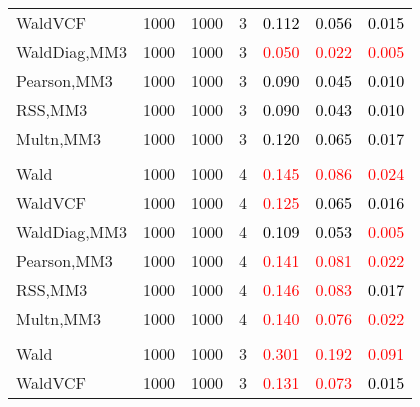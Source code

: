 \documentclass[
]{article}
\begin{document}
\begin{table}[H]
{\begin{tabular}[t]{lrrrrrr}
\hspace{1em}WaldVCF & 1000 & 1000 & 3 & \textcolor{black}{0.112} & \textcolor{black}{0.056} & \textcolor{black}{0.015}\\
\hspace{1em}WaldDiag,MM3 & 1000 & 1000 & 3 & \textcolor{red}{0.050} & \textcolor{red}{0.022} & \textcolor{red}{0.005}\\
\hspace{1em}Pearson,MM3 & 1000 & 1000 & 3 & \textcolor{black}{0.090} & \textcolor{black}{0.045} & \textcolor{black}{0.010}\\
\hspace{1em}RSS,MM3 & 1000 & 1000 & 3 & \textcolor{black}{0.090} & \textcolor{black}{0.043} & \textcolor{black}{0.010}\\
\hspace{1em}Multn,MM3 & 1000 & 1000 & 3 & \textcolor{black}{0.120} & \textcolor{black}{0.065} & \textcolor{black}{0.017}\\
\addlinespace[0.3em]
\multicolumn{7}{l}{\textbf{1F 15V}}\\
\hspace{1em}Wald & 1000 & 1000 & 4 & \textcolor{red}{0.145} & \textcolor{red}{0.086} & \textcolor{red}{0.024}\\
\hspace{1em}WaldVCF & 1000 & 1000 & 4 & \textcolor{red}{0.125} & \textcolor{black}{0.065} & \textcolor{black}{0.016}\\
\hspace{1em}WaldDiag,MM3 & 1000 & 1000 & 4 & \textcolor{black}{0.109} & \textcolor{black}{0.053} & \textcolor{red}{0.005}\\
\hspace{1em}Pearson,MM3 & 1000 & 1000 & 4 & \textcolor{red}{0.141} & \textcolor{red}{0.081} & \textcolor{red}{0.022}\\
\hspace{1em}RSS,MM3 & 1000 & 1000 & 4 & \textcolor{red}{0.146} & \textcolor{red}{0.083} & \textcolor{black}{0.017}\\
\hspace{1em}Multn,MM3 & 1000 & 1000 & 4 & \textcolor{red}{0.140} & \textcolor{red}{0.076} & \textcolor{red}{0.022}\\
\addlinespace[0.3em]
\multicolumn{7}{l}{\textbf{2F 10V}}\\
\hspace{1em}Wald & 1000 & 1000 & 3 & \textcolor{red}{0.301} & \textcolor{red}{0.192} & \textcolor{red}{0.091}\\
\hspace{1em}WaldVCF & 1000 & 1000 & 3 & \textcolor{red}{0.131} & \textcolor{red}{0.073} & \textcolor{black}{0.015}\\

\end{tabular}}
\end{table}
\end{document}
